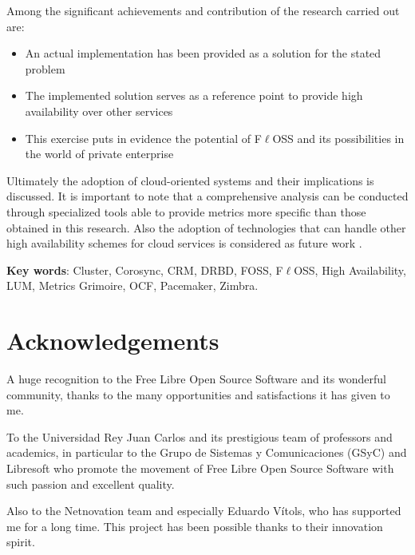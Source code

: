 \documentclass[a4paper, 12pt]{book}
\begin{document}

\noindent Among the significant achievements and contribution of the research carried out are:

\begin{itemize}
  \item An actual implementation has been provided as a solution for the stated problem
  \item The implemented solution serves as a reference point to provide high availability over other services
  \item This exercise puts in evidence the potential of F$\ell$OSS and its possibilities in the world of private enterprise
\end{itemize}


\noindent Ultimately the adoption of cloud-oriented systems and their implications is discussed. It is important to note that a comprehensive analysis can be conducted through specialized tools able to provide metrics more specific than those obtained in this research. Also the adoption of technologies that can handle other high availability schemes for cloud services is considered as future work .\bigskip

\noindent
{\bf Key words}: Cluster, Corosync, CRM, DRBD, FOSS, F$\ell$OSS, High Availability, LUM, Metrics Grimoire, OCF, Pacemaker, Zimbra.

%
\chapter*{Acknowledgements}
\label{chap:acknowledgements}

\noindent A huge recognition to the Free Libre Open Source Software and its wonderful community, thanks to the many opportunities and satisfactions it has given to me.\bigskip

\noindent To the Universidad Rey Juan Carlos and its prestigious team of professors and academics, in particular to the Grupo de Sistemas y Comunicaciones (GSyC) and Libresoft who promote the movement of Free Libre Open Source Software with such passion and excellent quality.\bigskip

\noindent Also to the Netnovation team and especially Eduardo V\'{i}tols, who has supported me for a long time. This project has been possible thanks to their innovation spirit.\bigskip
\end{document}
